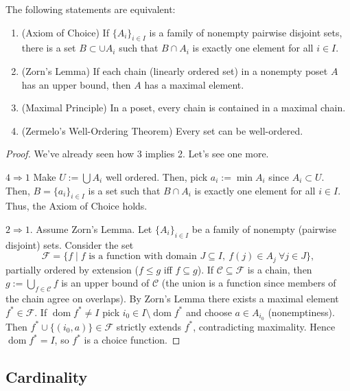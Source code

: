 \begin{theorem}
The following statements are equivalent:
\begin{enumerate}
  \item (Axiom of Choice) If $\{A_i\}_{i\in I}$ is a family of nonempty pairwise disjoint sets, there is a set $B\subset\cup A_i$ such that $B\cap A_i$ is exactly one element for all $i\in I$.
  \item (Zorn's Lemma) If each chain (linearly ordered set) in a nonempty poset $A$ has an upper bound, then $A$ has a maximal element.
  \item (Maximal Principle) In a poset, every chain is contained in a maximal chain.
  \item (Zermelo's Well-Ordering Theorem) Every set can be well-ordered.
\end{enumerate}
\end{theorem}
\begin{proof}
We've already seen how 3 implies 2. Let's see one more.

  $4\Rightarrow 1$ Make $U:=\bigcup A_i$ well ordered. Then, pick $a_i:=\min A_i$ since $A_i\subset U$. Then, $B=\{a_i\}_{i\in I}$ is a set such that $B\cap A_i$ is exactly one element for all $i\in I$. Thus, the Axiom of Choice holds.

  $2\Rightarrow1$. Assume Zorn's Lemma. Let $\{A_i\}_{i\in I}$ be a family of nonempty (pairwise disjoint) sets. Consider the set
  \[
  \mathcal{F}=\{f\mid f \text{ is a function with domain }J\subseteq I,\ f(j)\in A_j\ \forall j\in J\},
  \]
  partially ordered by extension ($f\le g$ iff $f\subseteq g$). If $\mathcal{C}\subseteq\mathcal{F}$ is a chain, then $g:=\bigcup_{f\in\mathcal{C}}f$ is an upper bound of $\mathcal{C}$ (the union is a function since members of the chain agree on overlaps). By Zorn's Lemma there exists a maximal element $f^\ast\in\mathcal{F}$. If $\operatorname{dom}f^\ast\neq I$ pick $i_0\in I\setminus\operatorname{dom}f^\ast$ and choose $a\in A_{i_0}$ (nonemptiness). Then $f^\ast\cup\{(i_0,a)\}\in\mathcal{F}$ strictly extends $f^\ast$, contradicting maximality. Hence $\operatorname{dom}f^\ast=I$, so $f^\ast$ is a choice function. 
\end{proof}









\newpage


\subsection{Cardinality}

